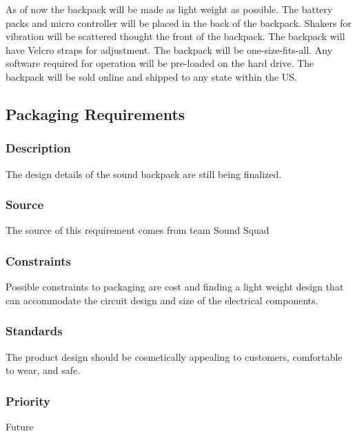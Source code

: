 As of now the backpack will be made as light weight as possible. The battery packs and micro controller will be placed in the back of the backpack. Shakers for vibration will be scattered thought the front of the backpack. The backpack will have Velcro straps for adjustment. The backpack will be one-size-fits-all. Any software required for operation will be pre-loaded on the hard drive. The backpack will be sold online and shipped to any state within the US.

\subsection{Packaging Requirements}
\subsubsection{Description}
The design details of the sound backpack are still being finalized.
\subsubsection{Source}
The source of this requirement comes from team Sound Squad
\subsubsection{Constraints}
Possible constraints to packaging are cost and finding a light weight design that can accommodate the circuit design and size of the electrical components. 
\subsubsection{Standards}
The product design should be cosmetically appealing to customers, comfortable to wear, and safe.
\subsubsection{Priority}
Future